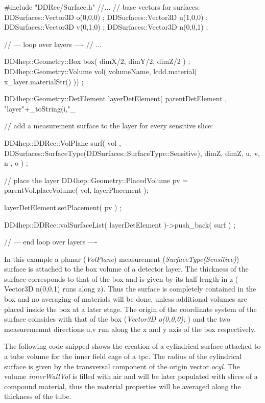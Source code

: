 \documentclass[10pt,a4paper]{article}
\begin{document}
\begin{code}
  #include "DDRec/Surface.h"
  //...
  // base vectors for surfaces:
  DDSurfaces::Vector3D o(0,0,0) ;
  DDSurfaces::Vector3D u(1,0,0) ;
  DDSurfaces::Vector3D v(0,1,0) ;
  DDSurfaces::Vector3D n(0,0,1) ;

  // --- loop over layers ----
  // ...

    DD4hep::Geometry::Box  box( dimX/2, dimY/2, dimZ/2 ) ;
    DD4hep::Geometry::Volume vol( volumeName, lcdd.material( x_layer.materialStr() )) ;

    DD4hep::Geometry::DetElement layerDetElement( parentDetElement , "layer"+_toString(i,"_%

    // add a measurement surface to the layer for every sensitive slice:

    DD4hep::DDRec::VolPlane surf( vol , 
                          DDSurfaces::SurfaceType(DDSurfaces::SurfaceType::Sensitive),
                          dimZ, dimZ, 
                          u, v, n , o ) ; 

    // place the layer
    DD4hep::Geometry::PlacedVolume pv = parentVol.placeVolume(  vol, layerPlacement );

    layerDetElement.setPlacement( pv ) ;

    DD4hep::DDRec::volSurfaceList( layerDetElement )->push_back( surf ) ;

  // --- end loop over layers ----

\end{code}
In this example a planar ({\em VolPlane}) measurement ({\em SurfaceType(Sensitive)})
surface is attached to the box volume of a detector layer.
The thickness of the surface corresponds to that of the box and is given by its half length in z
( Vector3D n(0,0,1) runs along z). Thus the surface is completely contained in 
the box and no averaging of materials will be done, unless additional volumes
are placed inside the box at a later stage. 
The origin of the coordinate system of the surface coinsides with that of the box
({\em Vector3D o(0,0,0); })
and the two measurememnt directions u,v run along the x and y axis of the box
respectively.

\noindent
The following code snipped shows the creation of a cylindrical surface attached
to a tube volume for the inner field cage of a tpc. The radius of the cylindrical
surface is given by the transversal component of the origin vector {\em ocyl}.
The volume {\em innerWallVol} is filled with air and will be later populated
with slices of a compound material, thus the material properties will be
averaged along the thickness of the tube.
\end{document}
